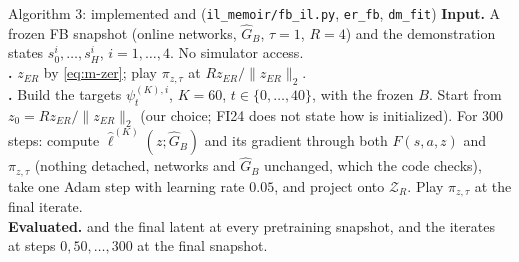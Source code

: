\begin{algobox}{Algorithm 3: implemented \ERFB{} and \DMFB{} (\texttt{il\_memoir/fb\_il.py}, \texttt{er\_fb}, \texttt{dm\_fit})}
\small
\textbf{Input.} A frozen FB snapshot (online networks, $\hat G_B$, $\tau=1$, $R=4$) and the demonstration states $s^i_0,\dots,s^i_H$, $i=1,\dots,4$. No simulator access.\\[2pt]
\textbf{\ERFB.} $z_{ER}$ by \eqref{eq:m-zer}; play $\pi_{z,\tau}$ at $Rz_{ER}/\lVert z_{ER}\rVert_2$.\\[2pt]
\textbf{\DMFB.} Build the targets $\psi^{(K),i}_t$, $K=60$, $t\in\{0,\dots,40\}$, with the frozen $B$. Start from $z_0=Rz_{ER}/\lVert z_{ER}\rVert_2$ (our choice; FI24 does not state how \DMFB{} is initialized). For $300$ steps: compute $\hat\ell^{(K)}(z;\hat G_B)$ and its gradient through both $F(s,a,z)$ and $\pi_{z,\tau}$ (nothing detached, networks and $\hat G_B$ unchanged, which the code checks), take one Adam step with learning rate $0.05$, and project onto $\mathcal Z_R$. Play $\pi_{z,\tau}$ at the final iterate.\\[2pt]
\textbf{Evaluated.} \ERFB{} and the final \DMFB{} latent at every pretraining snapshot, and the \DMFB{} iterates at steps $0,50,\dots,300$ at the final snapshot.
\end{algobox}

